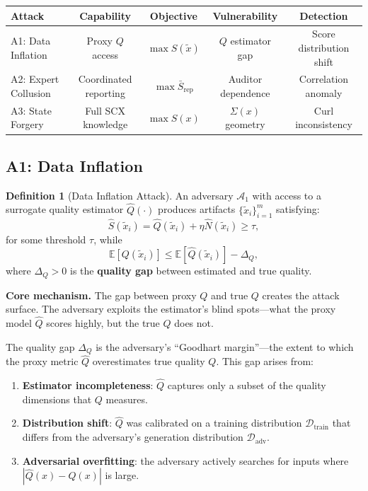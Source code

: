 \documentclass[11pt,a4paper]{article}
\theoremstyle{plain}
\theoremstyle{definition}
\newtheorem{definition}[theorem]{Definition}
\theoremstyle{remark}
\newcommand{\bbE}{\mathbb{E}}
\newcommand{\cA}{\mathcal{A}}
\newcommand{\cD}{\mathcal{D}}
\begin{document}
\begin{center}
\begin{tabular}{@{}lcccc@{}}
\toprule
\textbf{Attack} & \textbf{Capability} & \textbf{Objective} & \textbf{Vulnerability} & \textbf{Detection} \\
\midrule
A1: Data Inflation   & Proxy \(Q\) access  & \(\max S(\tilde{x})\)     & \(Q\) estimator gap  & Score distribution shift \\
A2: Expert Collusion & Coordinated reporting & \(\max \bar{S}_{\text{rep}}\) & Auditor dependence & Correlation anomaly \\
A3: State Forgery    & Full SCX knowledge  & \(\max S(x)\)       & \(\Sigma(x)\) geometry & Curl inconsistency \\
\bottomrule
\end{tabular}
\end{center}

\subsection{A1: Data Inflation}
\begin{definition}[Data Inflation Attack]\label{def:a1}
  An adversary \(\cA_1\) with access to a surrogate quality estimator \(\hat{Q}(\cdot)\)
  produces artifacts \(\{\tilde{x}_i\}_{i=1}^m\) satisfying:
  \[ \hat{S}(\tilde{x}_i) = \hat{Q}(\tilde{x}_i) + \eta \hat{N}(\tilde{x}_i) \geq \tau, \]
  for some threshold \(\tau\), while
  \[ \bbE[Q(\tilde{x}_i)] \leq \bbE[\hat{Q}(\tilde{x}_i)] - \Delta_Q, \]
  where \(\Delta_Q > 0\) is the \textbf{quality gap} between estimated and true quality.
\end{definition}

\noindent
\textbf{Core mechanism.} The gap between proxy \(Q\) and true \(Q\) creates the attack surface. The adversary exploits the estimator's blind spots---what the proxy model \(\hat{Q}\) scores highly, but the true \(Q\) does not.

The quality gap \(\Delta_Q\) is the adversary's ``Goodhart margin''---the extent to which
the proxy metric \(\hat{Q}\) overestimates true quality \(Q\). This gap arises from:
\begin{enumerate}[label=(\roman*)]
  \item \textbf{Estimator incompleteness}: \(\hat{Q}\) captures only a subset of the
        quality dimensions that \(Q\) measures.
  \item \textbf{Distribution shift}: \(\hat{Q}\) was calibrated on a training distribution
        \(\cD_{\text{train}}\) that differs from the adversary's generation distribution
        \(\cD_{\text{adv}}\).
  \item \textbf{Adversarial overfitting}: the adversary actively searches for inputs
        where \(|\hat{Q}(x) - Q(x)|\) is large.
\end{enumerate}
\end{document}
